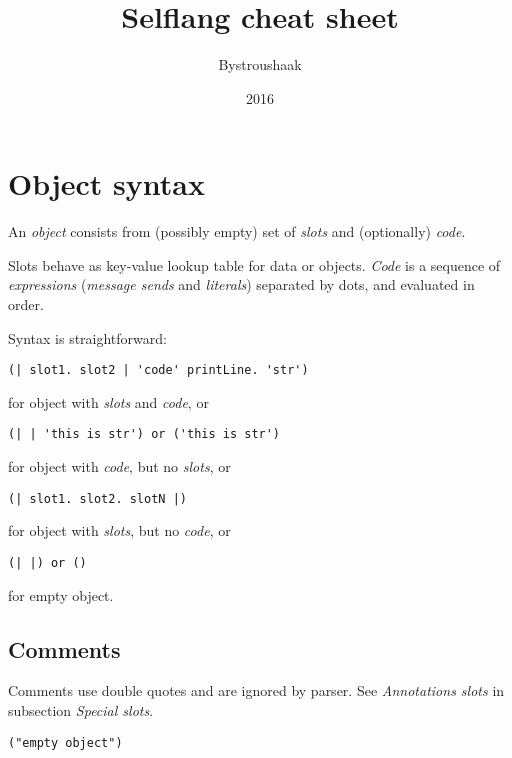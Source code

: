 \documentclass[10pt]{article}
\title{Selflang cheat sheet}
\author{Bystroushaak}
\date{2016}
\renewcommand{\maketitle}{
    {\begin{center}\Large \mythetitle\end{center}}
}
\begin{document}
\begin{multicols*}{3}
\maketitle

\section{Object syntax}

An \textit{object} consists from (possibly empty) set of \textit{slots} and (optionally) \textit{code}.

Slots behave as key-value lookup table for data or objects. \textit{Code} is a sequence of \textit{expressions} (\textit{message sends} and \textit{literals}) separated by dots, and evaluated in order.

Syntax is straightforward:

\begin{lstlisting}
(| slot1. slot2 | 'code' printLine. 'str')
\end{lstlisting}

for object with \textit{slots} and \textit{code}, or

\begin{lstlisting}
(| | 'this is str') or ('this is str')
\end{lstlisting}

for object with \textit{code}, but no \textit{slots}, or

\begin{lstlisting}
(| slot1. slot2. slotN |)
\end{lstlisting}

for object with \textit{slots}, but no \textit{code}, or

\begin{lstlisting}
(| |) or ()
\end{lstlisting}

for empty object.



\subsection{Comments}

Comments use double quotes and are ignored by parser. See \textit{Annotations slots} in subsection \textit{Special slots}.

\begin{lstlisting}
("empty object")
\end{lstlisting}





\end{multicols*}
\end{document}
